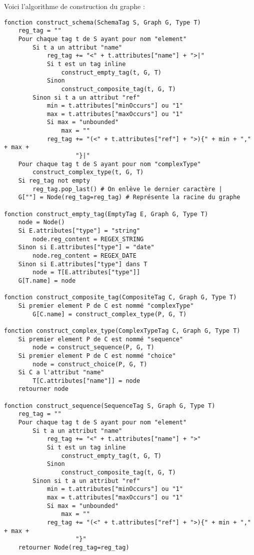 \documentclass[10pt, a4paper]{article}
\begin{document}
Voici l'algorithme de construction du graphe :

\begin{verbatim}
fonction construct_schema(SchemaTag S, Graph G, Type T)
    reg_tag = ""
    Pour chaque tag t de S ayant pour nom "element"
        Si t a un attribut "name"
            reg_tag += "<" + t.attributes["name"] + ">|"
            Si t est un tag inline
                construct_empty_tag(t, G, T)
            Sinon
                construct_composite_tag(t, G, T)
        Sinon si t a un attribut "ref"
            min = t.attributes["minOccurs"] ou "1"
            max = t.attributes["maxOccurs"] ou "1"
            Si max = "unbounded"
                max = ""
            reg_tag += "(<" + t.attributes["ref"] + ">){" + min + "," + max +
                    "}|"
    Pour chaque tag t de S ayant pour nom "complexType"
        construct_complex_type(t, G, T)
    Si reg_tag not empty
        reg_tag.pop_last() # On enlève le dernier caractère |
    G[""] = Node(reg_tag=reg_tag) # Représente la racine du graphe

fonction construct_empty_tag(EmptyTag E, Graph G, Type T)
    node = Node()
    Si E.attributes["type"] = "string"
        node.reg_content = REGEX_STRING
    Sinon si E.attributes["type"] = "date"
        node.reg_content = REGEX_DATE
    Sinon si E.attributes["type"] dans T
        node = T[E.attributes["type"]]
    G[T.name] = node

fonction construct_composite_tag(CompositeTag C, Graph G, Type T)
    Si premier element P de C est nommé "complexType"
        G[C.name] = construct_complex_type(P, G, T)

fonction construct_complex_type(ComplexTypeTag C, Graph G, Type T)
    Si premier element P de C est nommé "sequence"
        node = construct_sequence(P, G, T)
    Si premier element P de C est nommé "choice"
        node = construct_choice(P, G, T)
    Si C a l'attribut "name"
        T[C.attributes["name"]] = node
    retourner node

fonction construct_sequence(SequenceTag S, Graph G, Type T)
    reg_tag = ""
    Pour chaque tag t de S ayant pour nom "element"
        Si t a un attribut "name"
            reg_tag += "<" + t.attributes["name"] + ">"
            Si t est un tag inline
                construct_empty_tag(t, G, T)
            Sinon
                construct_composite_tag(t, G, T)
        Sinon si t a un attribut "ref"
            min = t.attributes["minOccurs"] ou "1"
            max = t.attributes["maxOccurs"] ou "1"
            Si max = "unbounded"
                max = ""
            reg_tag += "(<" + t.attributes["ref"] + ">){" + min + "," + max +
                    "}"
    retourner Node(reg_tag=reg_tag)


\end{verbatim}
\end{document}
